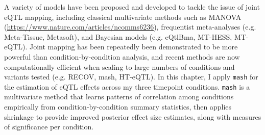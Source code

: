 %
A variety of models have been proposed and developed to tackle the issue of joint \gls{eQTL} mapping, including
classical multivariate methods such as \gls{MANOVA} (\url{https://www.nature.com/articles/ncomms6236}),
frequentist meta-analyses (e.g. Meta-Tissue, Metasoft), 
and Bayesian models (e.g. eQtlBma, MT-HESS, MT-eQTL).
Joint mapping has been repeatedly been demonstrated to be more powerful than condition-by-condition analysis,
and recent methods are now computationally efficient when scaling to large numbers of conditions and variants tested (e.g. RECOV, mash, HT-eQTL).
In this chapter, I apply \texttt{mash} for the estimation of \gls{eQTL} effects across my three timepoint conditions.
\texttt{mash} is a multivariate method that learns patterns of correlation among conditions empirically from condition-by-condition summary statistics,
then applies shrinkage to provide improved posterior effect size estimates,
along with measures of significance per condition. 

